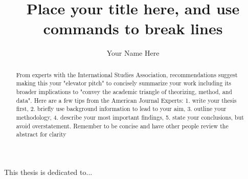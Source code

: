 \documentclass[12pt]{report}
\author{Your Name Here}
\title{Place your title here, and use \protect\\
  commands to break lines}
\begin{document}
%
%
%
%
\titlepage




\begin{dedication}
This thesis is dedicated to...
\end{dedication}



\begin{acknowledgments}

\end{acknowledgments}
%
%
\begin{abstract}

From experts with the International Studies Association, recommendations suggest
making this your "elevator pitch" to concisely summarize your work including its
broader implications to "convey the academic triangle of theorizing, method, and
data".  Here are a few tips from the American Journal Experts: 1. write your
thesis first, 2. briefly use background information to lead to your aim, 3.
outline your methodology, 4. describe your most important findings, 5. state
your conclusions, but avoid overstatement. Remember to be concise and have other
people  review the abstract for clarity

\end{abstract}

\tableofcontents
%
%
\listoftables
%
\listoffigures
\end{document}
